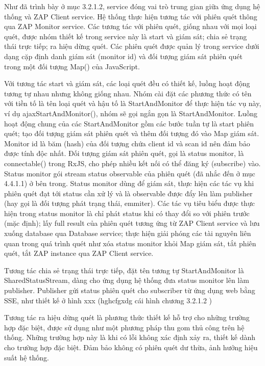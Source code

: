 \tab Như đã trình bày ở mục 3.2.1.2, service đóng vai trò trung gian giữa ứng dụng hệ thống và ZAP Client service. Hệ thống thực hiện tương tác với phiên quét thông qua ZAP Monitor service. Các tương tác với phiên quét, giống nhau với mọi loại quét, được nhóm thiết kế trong service này là start và giám sát; chia sẻ trạng thái trực tiếp; ra hiệu dừng quét. Các phiên quét được quản lý trong service dưới dạng cặp định danh giám sát (monitor id) và đối tượng giám sát phiên quét trong một đối tượng Map() của JavaScript.
\par

Với tương tác start và giám sát, các loại quét đều có thiết kế, luồng hoạt động tương tự nhau nhưng không giống nhau. Nhóm cài đặt các phương thức có tên với tiền tố là tên loại quét và hậu tố là StartAndMonitor để thực hiện tác vụ này, ví dụ ajaxStartAndMonitor(), nhóm sẽ gọi ngắn gọn là StartAndMonitor. Luồng hoạt động chung của các StartAndMonitor gồm các bước tuần tự là start phiên quét; tạo đối tượng giám sát phiên quét và thêm đối tượng đó vào Map giám sát. Monitor id là băm (hash) của đối tượng chứa client id và scan id nên đảm bảo được tính độc nhất. Đối tượng giám sát phiên quét, gọi là status monitor, là connectable() trong RxJS, cho phép nhiều kết nối có thể đăng ký (subscribe) vào. Status monitor gói stream status observable của phiên quét (đã nhắc đến ở mục 4.4.1.1) ở bên trong. Status monitor dùng để giám sát, thực hiện các tác vụ khi phiên quét đạt tới status cần xử lý và là observable được đẩy lên làm publisher (hay gọi là đối tượng phát trạng thái, emmiter). Các tác vụ tiêu biểu được thực hiện trong status monitor là chỉ phát status khi có thay đổi so với phiên trước (mặc định); lấy full result của phiên quét tương ứng từ ZAP Client service và lưu xuống database qua Database service; thực hiện giải phóng các tài nguyên liên quan trong quá trình quét như xóa status monitor khỏi Map giám sát, tắt phiên quét, tắt ZAP instance qua ZAP Client service.
\par

Tương tác chia sẻ trạng thái trực tiếp, đặt tên tương tự StartAndMonitor là SharedStatusStream, dàng cho ứng dụng hệ thống đưa status monitor lên làm publisher. Publisher gửi status phiên quét cho subscriber từ ứng dụng web bằng SSE, như thiết kế ở hình xxx (hghcfgxdg cái hình chương 3.2.1.2 )
\par

Tương tác ra hiệu dừng quét là phương thức thiết kế hỗ trợ cho những trường hợp đặc biệt, được sử dụng như một phương pháp thu gom thủ công trên hệ thống. Những trường hợp này là khi có lỗi không xác định xảy ra, thiết kế dành cho trường hợp đặc biệt. Đảm bảo không có phiên quét dư thừa, ảnh hưởng hiệu suất hệ thống.

